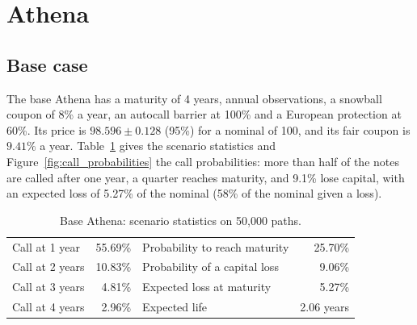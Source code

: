 \documentclass[11pt,a4paper]{article}
\begin{document}
\section{Athena}\label{sec:athena}

\subsection{Base case}
The base Athena has a maturity of 4 years, annual observations, a snowball coupon of 8\% a year, an autocall
barrier at 100\% and a European protection at 60\%. Its price is $98.596 \pm 0.128$ (95\%) for a nominal of 100,
and its fair coupon is $9.41\%$ a year. Table~\ref{tab:athena_base} gives the scenario statistics and
Figure~\ref{fig:call_probabilities} the call probabilities: more than half of the notes are called after one year,
a quarter reaches maturity, and 9.1\% lose capital, with an expected loss of 5.27\% of the nominal (58\% of the
nominal given a loss).

\begin{table}[h]
\centering
\begin{tabular}{@{}lr@{\qquad}lr@{}}
\toprule
Call at 1 year & 55.69\% & Probability to reach maturity & 25.70\% \\
Call at 2 years & 10.83\% & Probability of a capital loss & 9.06\% \\
Call at 3 years & 4.81\% & Expected loss at maturity & 5.27\% \\
Call at 4 years & 2.96\% & Expected life & 2.06 years \\
\bottomrule
\end{tabular}
\caption{Base Athena: scenario statistics on 50{,}000 paths.}
\label{tab:athena_base}
\end{table}
\end{document}
